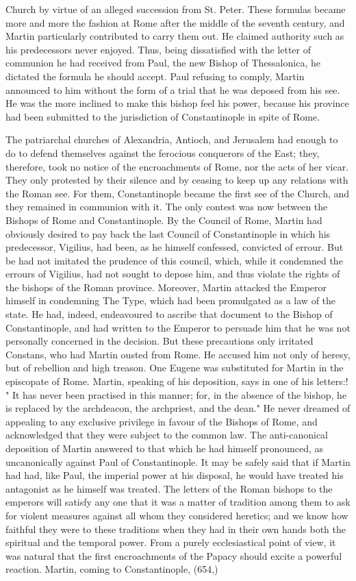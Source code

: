 Church by virtue of an alleged succession from St. Peter. These formulas became more and more the fashion at Rome after the middle of the seventh century, and Martin particularly contributed to carry them out. He claimed authority such as his predecessors never enjoyed. Thus, being dissatisfied with the letter of communion he had received from Paul, the new Bishop of Thessalonica, he dictated the formula he should accept. Paul refusing to comply, Martin announced to him without the form of a trial that he was deposed from his see. He was the more inclined to make this bishop feel his power, because his province had been submitted to the jurisdiction of Constantinople in spite of Rome.

The patriarchal churches of Alexandria, Antioch, and Jerusalem had enough to do to defend themselves against the ferocious conquerors of the East; they, therefore, took no notice of the encroachments of Rome, nor the acts of her vicar. They only protested by their silence and by ceasing to keep up any relations with the Roman see. For them, Constantinople became the first see of the Church, and they remained in communion with it. The only contest was now between the Bishops of Rome and Constantinople. By the Council of Rome, Martin had obviously desired to pay back the last Council of Constantinople in which his predecessor, Vigilius, had been, as he himself confessed, convicted of errour. But be had not imitated the prudence of this council, which, while it condemned the errours of Vigilius, had not sought to depose him, and thus violate the rights of the bishops of the Roman province. Moreover, Martin attacked the Emperor himself in condemning The Type, which had been promulgated as a law of the state. He had, indeed, endeavoured to ascribe that document to the Bishop of Constantinople, and had written to the Emperor to persuade him that he was not personally concerned in the decision. But these precautions only irritated Constans, who had Martin ousted from Rome. He accused him not only of heresy, but of rebellion and high treason. One Eugene was substituted for Martin in the episcopate of Rome. Martin, speaking of his deposition, says in one of his letters:! " It has never been practised in this manner; for, in the absence of the bishop, he is replaced by the archdeacon, the archpriest, and the dean." He never dreamed of appealing to any exclusive privilege in favour of the Bishops of Rome, and acknowledged that they were subject to the common law. The anti-canonical deposition of Martin answered to that which he had himself pronounced, as uncanonically against Paul of Constantinople. It may be safely said that if Martin had had, like Paul, the imperial power at his disposal, he would have treated his antagonist as he himself was treated. The letters of the Roman bishops to the emperors will satisfy any one that it was a matter of tradition among them to ask for violent measures against all whom they considered heretics; and we know how faithful they were to these traditions when they had in their own hands both the spiritual and the temporal power. From a purely ecclesiastical point of view, it was natural that the first encroachments of the Papacy should excite a powerful reaction. Martin, coming to Constantinople, (654,) 